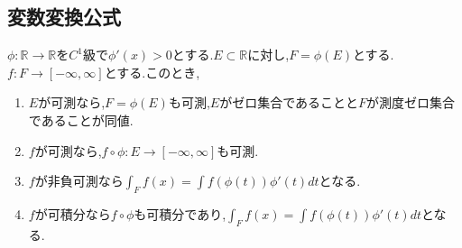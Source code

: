 \subsection{変数変換公式}
\begin{thm}
 $\phi: \mathbb{R} \to \mathbb{R}$を$C^1$級で$\phi'(x) > 0$とする.$E \subset \mathbb{R}$に対し,$F = \phi(E)$とする.
 $f : F \to [- \infty, \infty]$とする.このとき,
 \begin{enumerate}
     \item $E$が可測なら,$F = \phi(E)$も可測,$E$がゼロ集合であることと$F$が測度ゼロ集合であることが同値.
     \item $f$が可測なら,$f \circ \phi: E \to [- \infty, \infty]$も可測.
     \item $f$が非負可測なら$\int_F f(x) = \int f(\phi(t)) \phi'(t) dt$となる.
     \item $f$が可積分なら$f\circ \phi$も可積分であり,$\int_F f(x) = \int f(\phi(t)) \phi'(t) dt$となる.
 \end{enumerate}
\end{thm}

